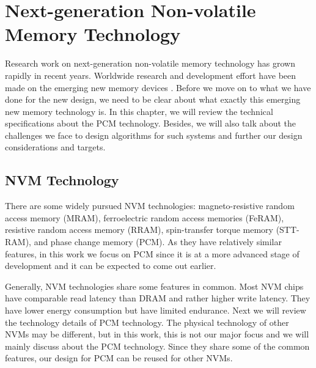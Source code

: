\chapter{Next-generation Non-volatile Memory Technology}
\label{sec:technology}

Research work on next-generation non-volatile memory technology has grown rapidly in recent years.
Worldwide research and development effort have been made on the emerging new memory devices \cite{wong2010phase}.
Before we move on to what we have done for the new design, we need to be clear about what exactly this
emerging new memory technology is. In this chapter, we will review the technical specifications
about the PCM technology. Besides, we will also talk about the challenges we face to design algorithms
for such systems and further our design considerations and targets.

\section{NVM Technology}

There are some widely pursued NVM technologies:
magneto-resistive random access memory (MRAM),
ferroelectric random access memories (FeRAM),
resistive random access memory (RRAM),
spin-transfer torque memory (STT-RAM),
and phase change memory (PCM).
As they have relatively similar features, in this work we focus on PCM since
it is at a more advanced stage of development and it can be expected to come out earlier.

Generally, NVM technologies share some features in common. Most NVM chips have comparable read latency than DRAM and rather
higher write latency. They have lower energy consumption but have limited endurance. Next we will review the technology details
of PCM technology. The physical technology of other NVMs may be different, but in this work, this is not our major focus and
we will mainly discuss about the PCM technology.
Since they share some of the common features, our design for PCM can be reused for other NVMs.



